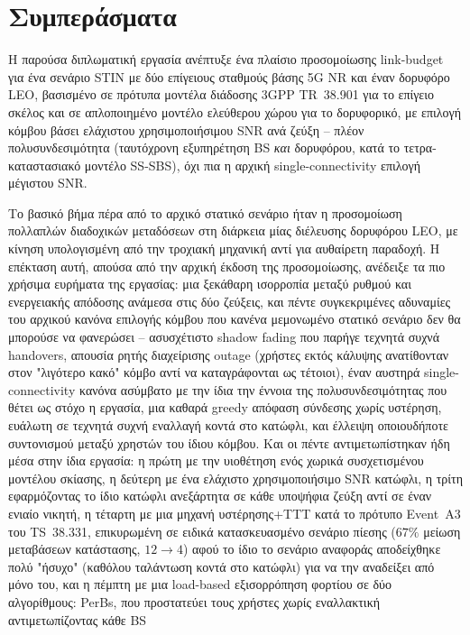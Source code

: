 \chapter{Συμπεράσματα}
\label{ch:conclusions}

Η παρούσα διπλωματική εργασία ανέπτυξε ένα πλαίσιο προσομοίωσης
link-budget για ένα σενάριο STIN με δύο επίγειους σταθμούς βάσης 5G NR
και έναν δορυφόρο LEO, βασισμένο σε πρότυπα μοντέλα διάδοσης 3GPP
TR~38.901 για το επίγειο σκέλος και σε απλοποιημένο μοντέλο ελεύθερου
χώρου για το δορυφορικό, με επιλογή κόμβου βάσει ελάχιστου
χρησιμοποιήσιμου SNR ανά ζεύξη -- πλέον πολυσυνδεσιμότητα (ταυτόχρονη
εξυπηρέτηση BS \emph{και} δορυφόρου, κατά το τετρα-καταστασιακό μοντέλο
SS-SBS), όχι πια η αρχική single-connectivity επιλογή μέγιστου SNR.

Το βασικό βήμα πέρα από το αρχικό στατικό σενάριο ήταν η προσομοίωση
πολλαπλών διαδοχικών μεταδόσεων στη διάρκεια μίας διέλευσης δορυφόρου
LEO, με κίνηση υπολογισμένη από την τροχιακή μηχανική αντί για αυθαίρετη
παραδοχή. Η επέκταση αυτή, απούσα από την αρχική έκδοση της
προσομοίωσης, ανέδειξε τα πιο χρήσιμα ευρήματα της εργασίας: μια
ξεκάθαρη ισορροπία μεταξύ ρυθμού και ενεργειακής απόδοσης ανάμεσα στις
δύο ζεύξεις, και πέντε συγκεκριμένες αδυναμίες του αρχικού κανόνα
επιλογής κόμβου που κανένα μεμονωμένο στατικό σενάριο δεν θα μπορούσε να
φανερώσει -- ασυσχέτιστο shadow fading που παρήγε τεχνητά συχνά
handovers, απουσία ρητής διαχείρισης outage (χρήστες εκτός κάλυψης
ανατίθονταν στον "λιγότερο κακό" κόμβο αντί να καταγράφονται ως τέτοιοι),
έναν αυστηρά single-connectivity κανόνα ασύμβατο με την ίδια την έννοια
της πολυσυνδεσιμότητας που θέτει ως στόχο η εργασία, μια καθαρά greedy
απόφαση σύνδεσης χωρίς υστέρηση, ευάλωτη σε τεχνητά συχνή εναλλαγή
κοντά στο κατώφλι, και έλλειψη οποιουδήποτε συντονισμού μεταξύ χρηστών
του ίδιου κόμβου. Και οι πέντε αντιμετωπίστηκαν ήδη μέσα στην ίδια
εργασία: η πρώτη με την υιοθέτηση ενός χωρικά συσχετισμένου μοντέλου
σκίασης, η δεύτερη με ένα ελάχιστο χρησιμοποιήσιμο SNR κατώφλι, η τρίτη
εφαρμόζοντας το ίδιο κατώφλι ανεξάρτητα σε κάθε υποψήφια ζεύξη αντί σε
έναν ενιαίο νικητή, η τέταρτη με μια μηχανή υστέρησης+TTT κατά το
πρότυπο Event~A3 του TS~38.331, επικυρωμένη σε ειδικά κατασκευασμένο
σενάριο πίεσης ($67\%$ μείωση μεταβάσεων κατάστασης, $12\rightarrow4$)
αφού το ίδιο το σενάριο αναφοράς αποδείχθηκε πολύ "ήσυχο" (καθόλου
ταλάντωση κοντά στο κατώφλι) για να την αναδείξει από μόνο του, και η
πέμπτη με μια load-based εξισορρόπηση φορτίου σε δύο αλγορίθμους: PerBs,
που προστατεύει τους χρήστες χωρίς εναλλακτική αντιμετωπίζοντας κάθε BS

